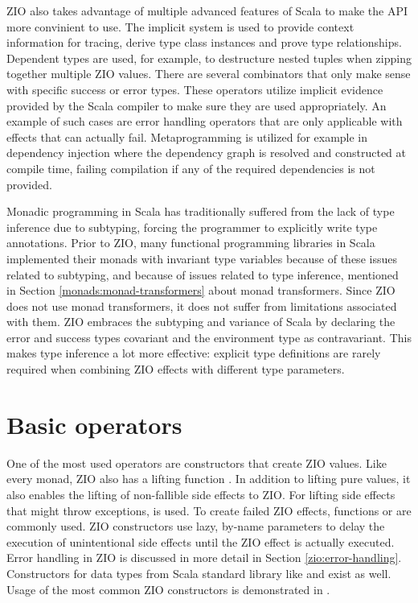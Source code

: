 ZIO also takes advantage of multiple advanced features of Scala to make the API more convinient to use. The implicit system is used to provide context information for tracing, derive type class instances and prove type relationships. Dependent types are used, for example, to destructure nested tuples when zipping together multiple ZIO values. There are several combinators that only make sense with specific success or error types. These operators utilize implicit evidence provided by the Scala compiler to make sure they are used appropriately. An example of such cases are error handling operators that are only applicable with effects that can actually fail. Metaprogramming is utilized for example in dependency injection where the dependency graph is resolved and constructed at compile time, failing compilation if any of the required dependencies is not provided.

Monadic programming in Scala has traditionally suffered from the lack of type inference due to subtyping, forcing the programmer to explicitly write type annotations. Prior to ZIO, many functional programming libraries in Scala implemented their monads with invariant type variables because of these issues related to subtyping, and because of issues related to type inference, mentioned in Section \ref{monads:monad-transformers} about monad transformers. Since ZIO does not use monad transformers, it does not suffer from limitations associated with them. ZIO embraces the subtyping and variance of Scala by declaring the error and success types covariant and the environment type as contravariant. This makes type inference a lot more effective: explicit type definitions are rarely required when combining ZIO effects with different type parameters.



\section{Basic operators}
One of the most used operators are constructors that create ZIO values. Like every monad, ZIO also has a lifting function . In addition to lifting pure values, it also enables the lifting of non-fallible side effects to ZIO. For lifting side effects that might throw exceptions,  is used. To create failed ZIO effects, functions  or  are commonly used. ZIO constructors use lazy, by-name parameters to delay the execution of unintentional side effects until the ZIO effect is actually executed.  Error handling in ZIO is discussed in more detail in Section \ref{zio:error-handling}. Constructors for data types from Scala standard library like  and  exist as well. Usage of the most common ZIO constructors is demonstrated in .

